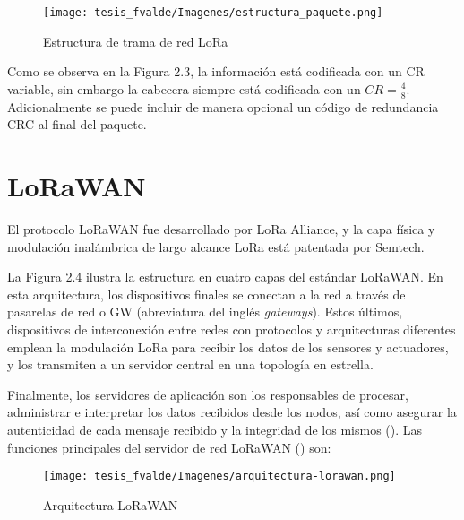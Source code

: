 \vspace{0.5cm}

\begin{figure}[h]
    \centering
    \texttt{[image: tesis\_fvalde/Imagenes/estructura\_paquete.png]}
    \caption{Estructura de trama de red LoRa}
    \label{fig:estructura_paquete}
\end{figure}

Como se observa en la Figura 2.3, la información está codificada con un CR variable, sin embargo la cabecera siempre está codificada con un $CR = \frac{4}{8}$. Adicionalmente se puede incluir de manera opcional un código de redundancia CRC al final del paquete. 

\section{LoRaWAN}

El protocolo LoRaWAN fue desarrollado por LoRa Alliance, y la capa física y modulación inalámbrica de largo alcance LoRa está patentada por Semtech. 

\vspace{0.5cm}

La Figura 2.4 ilustra la estructura en cuatro capas del estándar LoRaWAN. En esta arquitectura, los dispositivos finales se conectan a la red a través de pasarelas de red o GW (abreviatura del inglés \textit{gateways}). Estos últimos, dispositivos de interconexión entre redes con protocolos y arquitecturas diferentes emplean la modulación LoRa para recibir los datos de los sensores y actuadores, y los transmiten a un servidor central en una topología en estrella.

\vspace{0.5cm}

Finalmente, los servidores de aplicación son los responsables de procesar, administrar e interpretar los datos recibidos desde los nodos, así como asegurar la autenticidad de cada mensaje recibido y la integridad de los mismos (\cite{10.1007/978-3-031-08878-0_6}). Las funciones principales del servidor de red LoRaWAN (\cite{estrada2019diseno}) son:

\begin{figure}[h]
    \centering
    \texttt{[image: tesis\_fvalde/Imagenes/arquitectura-lorawan.png]}
    \caption{Arquitectura LoRaWAN}
    \label{fig:arquitectura_lorawan}
\end{figure}

